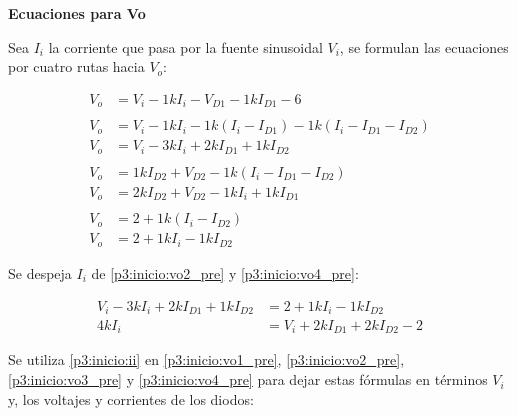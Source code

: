 %
%
%

\textbf{Ecuaciones para Vo}

Sea $I_i$ la corriente que pasa por la fuente sinusoidal $V_i$, se formulan las
ecuaciones por cuatro rutas hacia $V_o$:


\begin{align}
  V_o &= V_i - 1k I_i - V_{D1} - 1k I_{D1} - 6 \label{p3:inicio:vo1_pre}
  \\
  \nonumber \\
  V_o &= V_i - 1k I_i - 1k (I_i - I_{D1}) - 1k (I_i - I_{D1} - I_{D2}) \nonumber
  \\
  V_o &= V_i - 3k I_i + 2k I_{D1} + 1k I_{D2} \label{p3:inicio:vo2_pre}
  \\
  \nonumber \\
  V_o &= 1k I_{D2} + V_{D2} - 1k (I_i - I_{D1} - I_{D2}) \nonumber
  \\
  V_o &= 2k I_{D2} + V_{D2} - 1k I_i + 1k I_{D1} \label{p3:inicio:vo3_pre}
  \\
  \nonumber \\
  V_o &= 2 + 1k (I_i - I_{D2}) \nonumber
  \\
  V_o &= 2 + 1k I_i - 1k I_{D2} \label{p3:inicio:vo4_pre}
\end{align}

Se despeja $I_i$ de \ref{p3:inicio:vo2_pre} y \ref{p3:inicio:vo4_pre}:

\begin{align}
  V_i - 3k I_i + 2k I_{D1} + 1k I_{D2} &= 2 + 1k I_i - 1k I_{D2} \nonumber
  \\
  4k I_i &= V_i + 2k I_{D1} + 2k I_{D2} - 2 \label{p3:inicio:ii}
\end{align}

Se utiliza \ref{p3:inicio:ii} en \ref{p3:inicio:vo1_pre},
\ref{p3:inicio:vo2_pre}, \ref{p3:inicio:vo3_pre} y \ref{p3:inicio:vo4_pre} para
dejar estas fórmulas en términos $V_i$ y, los voltajes y corrientes
de los diodos:

